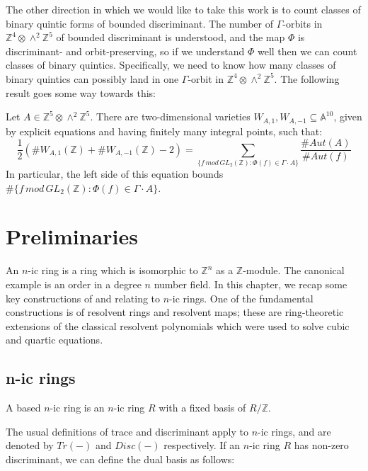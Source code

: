 \documentclass{report}
\begin{document}
The other direction in which we would like to take this work is to count classes of binary quintic forms of bounded discriminant.  The number of $\Gamma$-orbits in $\mathbb{Z}^4 \otimes \wedge^2 \mathbb{Z}^5$ of bounded discriminant is understood, and the map $\Phi$ is discriminant- and orbit-preserving, so if we understand $\Phi$ well then we can count classes of binary quintics.  Specifically, we need to know how many classes of binary quintics can possibly land in one $\Gamma$-orbit in $\mathbb{Z}^4 \otimes \wedge^2 \mathbb{Z}^5$.  The following result goes some way towards this:

\begin{theorem}
Let $A \in \mathbb{Z}^5 \otimes \wedge^2 \mathbb{Z}^5$.  There are two-dimensional varieties $W_{A,1}, W_{A,-1} \subseteq \mathbb{A}^{10}$, given by explicit equations and having finitely many integral points, such that:
\begin{equation}
\frac{1}{2}(\# W_{A,1}(\mathbb{Z}) + \# W_{A,-1}(\mathbb{Z}) - 2) = \sum_{\{f \, mod \, GL_2(\mathbb{Z}) : \Phi(f) \in \Gamma \cdot A \} } \frac{\#Aut(A)}{\#Aut(f)}
\end{equation}
In particular, the left side of this equation bounds $\# \{ f \, mod \, GL_2(\mathbb{Z}) : \Phi(f) \in \Gamma \cdot A \}$.
\end{theorem}

\chapter{Preliminaries}

An $n$-ic ring is a ring which is isomorphic to $\mathbb{Z}^n$ as a $\mathbb{Z}$-module.  The canonical example is an order in a degree $n$ number field.  In this chapter, we recap some key constructions of and relating to $n$-ic rings.  One of the fundamental constructions is of resolvent rings and resolvent maps; these are ring-theoretic extensions of the classical resolvent polynomials which were used to solve cubic and quartic equations.

\section{n-ic rings}

\begin{definition}
A based $n$-ic ring is an $n$-ic ring $R$ with a fixed basis of $R / \mathbb{Z}$.
\end{definition}

The usual definitions of trace and discriminant apply to $n$-ic rings, and are denoted by $Tr(-)$ and $Disc(-)$ respectively.  If an $n$-ic ring $R$ has non-zero discriminant, we can define the dual basis as follows:
\end{document}
